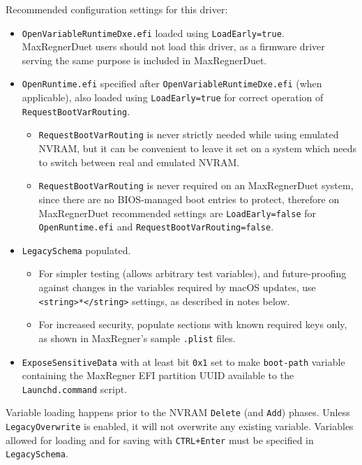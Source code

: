 \documentclass[]{article}
\providecommand{\tightlist}{%
  \setlength{\itemsep}{0pt}\setlength{\parskip}{0pt}}
\begin{document}
Recommended configuration settings for this driver:

\begin{itemize}
\tightlist
  \item \texttt{OpenVariableRuntimeDxe.efi} loaded using \texttt{LoadEarly=true}. MaxRegnerDuet users
  should not load this driver, as a firmware driver serving the same purpose is included in MaxRegnerDuet.
  \item \texttt{OpenRuntime.efi} specified after \texttt{OpenVariableRuntimeDxe.efi} (when applicable),
  also loaded using \texttt{LoadEarly=true} for correct operation of \texttt{RequestBootVarRouting}.
  \begin{itemize}
  \tightlist
    \item \texttt{RequestBootVarRouting} is never strictly needed while using emulated NVRAM, but
    it can be convenient to leave it set on a system which needs to switch between real and emulated NVRAM.
    \item \texttt{RequestBootVarRouting} is never required on an MaxRegnerDuet system, since there are
    no BIOS-managed boot entries to protect, therefore on MaxRegnerDuet recommended settings are
    \texttt{LoadEarly=false} for \texttt{OpenRuntime.efi} and \texttt{RequestBootVarRouting=false}.
  \end{itemize}
  \item \texttt{LegacySchema} populated.
  \begin{itemize}
  \tightlist
    \item For simpler testing (allows arbitrary test variables), and future-proofing against
    changes in the variables required by macOS updates, use \texttt{<string>*</string>} settings, as
    described in notes below.
    \item For increased security, populate sections with known required keys only, as shown in MaxRegner's
    sample \texttt{.plist} files.
  \end{itemize}
  \item \texttt{ExposeSensitiveData} with at least bit \texttt{0x1} set to make \texttt{boot-path}
  variable containing the MaxRegner EFI partition UUID available to the \texttt{Launchd.command} script.
\end{itemize}

Variable loading happens prior to the NVRAM \texttt{Delete} (and \texttt{Add}) phases. Unless
\texttt{LegacyOverwrite} is enabled, it will not overwrite any existing variable.
Variables allowed for loading and for saving with \texttt{CTRL+Enter} must be specified in \texttt{LegacySchema}.
\end{document}

